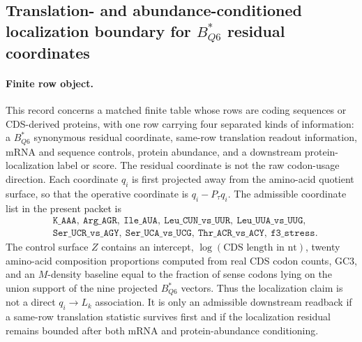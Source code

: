 \subsection{Translation- and abundance-conditioned localization boundary for $B^{*}_{Q6}$ residual coordinates}\label{sec:q6-translation-abundance-conditioned-protein-localization-cross-layer}

\paragraph{Finite row object.}
This record concerns a matched finite table whose rows are coding sequences or CDS-derived proteins, with one row carrying four separated kinds of information: a $B^{*}_{Q6}$ synonymous residual coordinate, same-row translation readout information, mRNA and sequence controls, protein abundance, and a downstream protein-localization label or score. The residual coordinate is not the raw codon-usage direction. Each coordinate $q_i$ is first projected away from the amino-acid quotient surface, so that the operative coordinate is $q_i-P_{\tau}q_i$. The admissible coordinate list in the present packet is
$$
\begin{aligned}
&\texttt{K\_AAA},\ \texttt{Arg\_AGR},\ \texttt{Ile\_AUA},\ \texttt{Leu\_CUN\_vs\_UUR},\ \texttt{Leu\_UUA\_vs\_UUG},\\
&\texttt{Ser\_UCR\_vs\_AGY},\ \texttt{Ser\_UCA\_vs\_UCG},\ \texttt{Thr\_ACR\_vs\_ACY},\ \texttt{f3\_stress}.
\end{aligned}
$$
The control surface $Z$ contains an intercept, $\log(\text{CDS length in nt})$, twenty amino-acid composition proportions computed from real CDS codon counts, GC3, and an $M$-density baseline equal to the fraction of sense codons lying on the union support of the nine projected $B^{*}_{Q6}$ vectors. Thus the localization claim is not a direct $q_i\to L_k$ association. It is only an admissible downstream readback if a same-row translation statistic survives first and if the localization residual remains bounded after both mRNA and protein-abundance conditioning.

